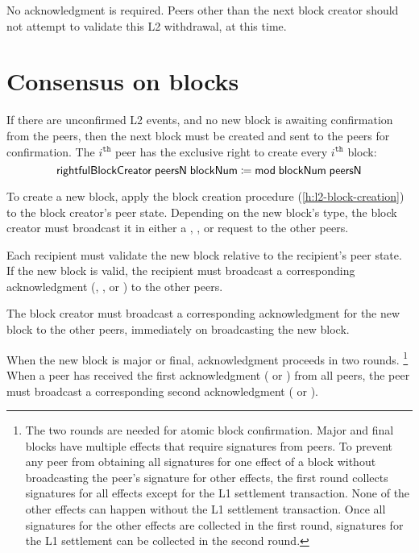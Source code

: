 \documentclass[../hydrozoa.tex]{subfiles}
\begin{document}
No acknowledgment is required.
Peers other than the next block creator should not attempt to validate this L2 withdrawal, at this time.

\section{Consensus on blocks}%
\label{h:l2-consensus-on-blocks}%

If there are unconfirmed L2 events, and no new block is awaiting confirmation from the peers, then the next block must be created and sent to the peers for confirmation.
The $i^\mathtt{th}$ peer has the exclusive right to create every $i^\mathtt{th}$ block: 
\begin{equation*}
  \mathsf{rightfulBlockCreator} \; \mathsf{peersN} \; \mathsf{blockNum} \coloneq
    \mathsf{mod} \; \mathsf{blockNum} \; \mathsf{peersN}
\end{equation*}

To create a new block, apply the block creation procedure (\cref{h:l2-block-creation}) to the block creator's peer state.
Depending on the new block's type, the block creator must broadcast it in either a , , or  request to the other peers.

Each recipient must validate the new block relative to the recipient's peer state.
If the new block is valid, the recipient must broadcast a corresponding acknowledgment (, , or ) to the other peers.

The block creator must broadcast a corresponding acknowledgment for the new block to the other peers, immediately on broadcasting the new block.

When the new block is major or final, acknowledgment proceeds in two rounds.%
\footnote{The two rounds are needed for atomic block confirmation.
  Major and final blocks have multiple effects that require signatures from peers.
  To prevent any peer from obtaining all signatures for one effect of a block without broadcasting the peer's signature for other effects, the first round collects signatures for all effects except for the L1 settlement transaction.
  None of the other effects can happen without the L1 settlement transaction.
  Once all signatures for the other effects are collected in the first round, signatures for the L1 settlement can be collected in the second round.
  }
When a peer has received the first acknowledgment ( or ) from all peers, the peer must broadcast a corresponding second acknowledgment ( or ).
\end{document}
